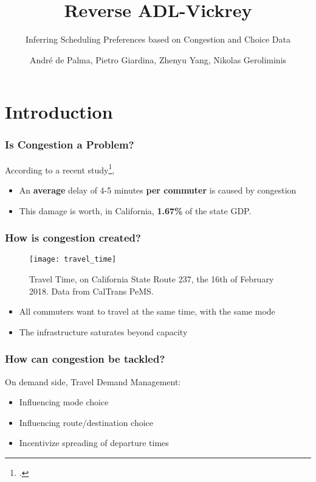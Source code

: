 \documentclass[hyperref={pdfpagelabels=false}]{beamer}
\title{Reverse ADL-Vickrey}
\subtitle{Inferring Scheduling Preferences based on Congestion and Choice Data}
\author[]{\small{Andr\'e de Palma, Pietro Giardina, Zhenyu Yang, Nikolas Geroliminis}}
\institute{ITEA Conference 2025}
\begin{document}
\begin{frame}
\titlepage
\end{frame}

\section{Introduction} %
\begin{frame}
  \tableofcontents[currentsection]
\end{frame}

\begin{frame}
  \frametitle{Is Congestion a Problem?}
  According to a recent study\footcite{kim2022congestion},
  \begin{itemize}
  \item An \textbf{average} delay of 4-5 minutes \textbf{per commuter} is caused by congestion
  \item This damage is worth, in California, \textbf{1.67\%} of the state GDP.
  \end{itemize}
\end{frame}

\begin{frame}
  \frametitle{How is congestion created?}
  \begin{figure}
    \centering
    \texttt{[image: travel\_time]}
    \caption{Travel Time, on California State Route 237, the 16th of February 2018.
    Data from CalTrans PeMS.}
    \label{fig:tt}
  \end{figure}
  \begin{itemize}
  \item All commuters want to travel at the same time, with the same mode
  \item<2-> The infrastructure saturates beyond capacity
  \end{itemize}
\end{frame}

\begin{frame}
  \frametitle{How can congestion be tackled?}
  On demand side, Travel Demand Management:
  \begin{itemize}
  \item<2-> Influencing mode choice
  \item<3-> Influencing route/destination choice
  \item<4-> Incentivize spreading of departure times
  \end{itemize}

\end{frame}
\end{document}

